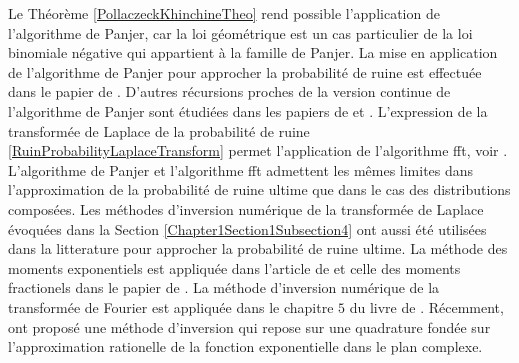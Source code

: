 Le Théorème \ref{PollaczeckKhinchineTheo} rend possible l'application de l'algorithme de Panjer, car la loi géométrique est un cas particulier de la loi binomiale négative qui appartient à la famille de Panjer. La mise en application de l'algorithme de Panjer pour approcher la probabilité de ruine est effectuée dans le papier de \citet{Di95}. D'autres récursions proches de la version continue de l'algorithme de Panjer sont étudiées dans les papiers de \citet{Di89} et \citet{GoVy84}. L'expression de la transformée de Laplace de la probabilité de ruine \eqref{RuinProbabilityLaplaceTransform} permet l'application de l'algorithme \gls{fft}, voir \citet{EmGrPi93}. L'algorithme de Panjer et l'algorithme \gls{fft} admettent les mêmes limites dans l'approximation de la probabilité de ruine ultime que dans le cas des distributions composées. Les méthodes d'inversion numérique de la transformée de Laplace évoquées dans la Section \ref{Chapter1Section1Subsection4} ont aussi été utilisées dans la litterature pour approcher la probabilité de ruine ultime.  La méthode des moments exponentiels est appliquée dans l\rq{}article de \citet{MnSaHa14} et celle des moments fractionels dans le papier de \citet{GzNITa13}. La méthode d'inversion numérique de la transformée de Fourier est appliquée dans le chapitre $5$ du livre de \citet{RoScScTe99}. Récemment, \citet{AlAvKo10} ont proposé une méthode d'inversion qui repose sur une quadrature fondée sur l'approximation rationelle de la fonction exponentielle dans le plan complexe.\\ 

